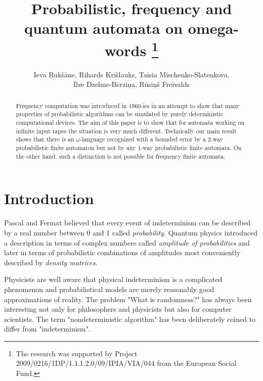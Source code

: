 \documentclass{llncs}
\begin{document}
\title{Probabilistic, frequency and quantum  automata on omega-words
\thanks{%
The research was supported by  Project 2009/0216/1DP/1.1.1.2.0/09/IPIA/VIA/044
from the 
European Social Fund.
} 
}

\author{
Ieva Ruk\v s\= ane,
Rihards Kri\v slauks,
Taisia Mischenko-Slatenkova,\\
Ilze Dzelme-B\= erzi\c na,
R\= usi\c n\v s Freivalds}

\maketitle

\begin{abstract}  Frequency computation was introduced in 1960-ies in an attempt to show that many properties of probabilistic algorithms can be simulated by purely deterministic computational devices. The aim of this paper is to show that for automata working on infinite input tapes the situation is very much different. Technically our main result shows that there is an $\omega$-language recognized with a bounded error by a 2-way probabilistic finite automaton but not by any 1-way probabilistic finite automata. On the other hand, such a distinction is not possible for frequency finite automata.

\end{abstract} 

\section{Introduction}


Pascal and Fermat believed that every event of indeterminism can be described by a real number between 0 and 1 called 
{\em probability}. Quantum physics introduced a description in terms of complex numbers called {\em amplitude of 
probabilities} and later in terms of probabilistic combinations of amplitudes most conveniently described by {\em density
matrices}.




Physicists are well aware that physical indeterminism is a complicated phenomenon and probabilistical models are merely reasonably good approximations of reality. The problem "What is randomness?" has always been interesting not only for philosophers and physicists but also for computer scientists. The term "nondeterministic algorithm" has been deliberately coined  to differ from "indeterminism".
\end{document}
